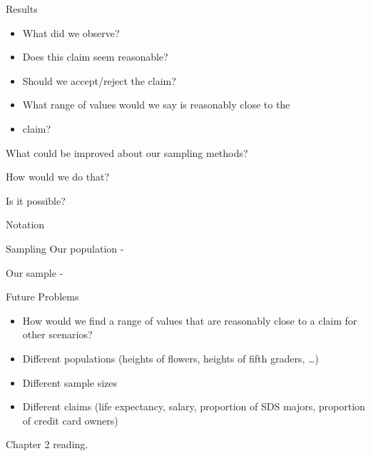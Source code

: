 \documentclass[
  ignorenonframetext,
]{beamer}
\begin{document}
\begin{frame}{Results}
\protect\hypertarget{results}{}
\begin{itemize}[<+->]
\item
  What did we observe?
\item
  Does this claim seem reasonable?
\item
  Should we accept/reject the claim?
\item
  What range of values would we say is reasonably close to the
\item
  claim?
\end{itemize}

What could be improved about our sampling methods?

How would we do that?

Is it possible?
\end{frame}

\begin{frame}{Notation}
\protect\hypertarget{notation}{}
\end{frame}

\begin{frame}{Sampling}
\protect\hypertarget{sampling}{}
Our population -

Our sample -
\end{frame}

\begin{frame}{Future Problems}
\protect\hypertarget{future-problems}{}
\begin{itemize}[<+->]
\item
  How would we find a range of values that are reasonably close to a
  claim for other scenarios?
\item
  Different populations (heights of flowers, heights of fifth graders,
  \ldots)
\item
  Different sample sizes
\item
  Different claims (life expectancy, salary, proportion of SDS majors,
  proportion of credit card owners)
\end{itemize}

Chapter 2 reading.
\end{frame}
\end{document}
